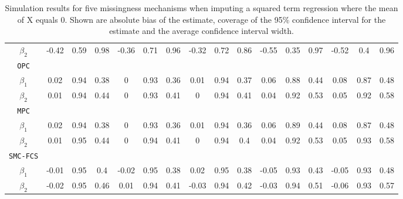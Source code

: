 \begin{table}[ht!]
{\begin{tabular}{c|ccc|ccc|ccc|ccc|ccc}
				$\beta_2$      & -0.42  & 0.59  & 0.98  & -0.36  & 0.71  & 0.96  & -0.32  & 0.72  & 0.86  & -0.55  & 0.35  & 0.97  & -0.52  & 0.4  & 0.96  \\ 
				\texttt{OPC}            &        &        &        &        &        &        &        &        &        &        &        &        &        &        &        \\
				$\beta_1$      & 0.02   & 0.94   & 0.38  & 0  & 0.93  & 0.36  & 0.01  & 0.94  & 0.37  & 0.06  & 0.88  & 0.44  & 0.08  & 0.87  & 0.48  \\
				$\beta_2$      & 0.01  & 0.94  & 0.44  & 0      & 0.93  & 0.41    & 0  & 0.94  & 0.41  & 0.04  & 0.92  & 0.53  & 0.05  & 0.92  & 0.58  \\
				\texttt{MPC}            &        &        &        &        &        &        &        &        &        &        &        &        &        &        &        \\
				$\beta_1$      & 0.02  & 0.94   & 0.38  & 0  & 0.93  & 0.36  & 0.01  & 0.94  & 0.36  & 0.06  & 0.89  & 0.44  & 0.08  & 0.87  & 0.48  \\
				$\beta_2$      & 0.01  & 0.95  & 0.44  & 0  & 0.94  & 0.41  & 0  & 0.94  & 0.4  & 0.04  & 0.92  & 0.53  & 0.05  & 0.93  & 0.58  \\
				\texttt{SMC-FCS}        &        &        &        &        &        &        &        &        &        &        &        &        &        &        &        \\
				$\beta_1$      & -0.01  & 0.95  & 0.4  & -0.02  & 0.95  & 0.38  & 0.02  & 0.95  & 0.38  & -0.05  & 0.93  & 0.43  & -0.05  & 0.93  & 0.48  \\
				$\beta_2$      & -0.02  & 0.95  & 0.46   & 0.01  & 0.94  & 0.41   & -0.03  & 0.94  & 0.42  & -0.03  & 0.94  & 0.51  & -0.06  & 0.93  & 0.57 
			\end{tabular}
		}
		\caption{Simulation results for five missingness mechanisms when imputing a squared term regression where the mean of X equals 0. Shown are absolute bias of the estimate, coverage of the 95\% confidence interval for the estimate and the average confidence interval width.}
		\label{tab2_3}
	\end{table}
	
